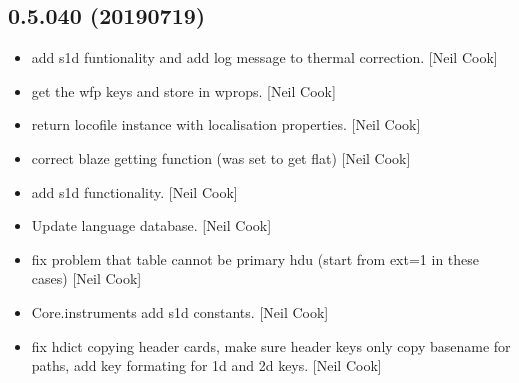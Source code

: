 \documentclass[a4paper,10pt,english]{report}
\begin{document}
\subsection{0.5.040 (2019\sphinxhyphen{}07\sphinxhyphen{}19)}
\label{\detokenize{misc/changelog:id121}}\begin{itemize}
\item {} 
 \sphinxhyphen{} add s1d funtionality and add log message
to thermal correction. {[}Neil Cook{]}

\item {} 
 \sphinxhyphen{} get the wfp keys and store in wprops. {[}Neil
Cook{]}

\item {} 
 \sphinxhyphen{} return locofile instance with
localisation properties. {[}Neil Cook{]}

\item {} 
 \sphinxhyphen{} correct blaze getting function (was set
to get flat) {[}Neil Cook{]}

\item {} 
 \sphinxhyphen{} add s1d functionality. {[}Neil Cook{]}

\item {} 
Update language database. {[}Neil Cook{]}

\item {} 
 \sphinxhyphen{} fix problem that table cannot be primary hdu (start from
ext=1 in these cases) {[}Neil Cook{]}

\item {} 
Core.instruments \sphinxhyphen{} add s1d constants. {[}Neil Cook{]}

\item {} 
 \sphinxhyphen{} fix hdict copying header cards, make sure header keys
only copy basename for paths, add key formating for 1d and 2d keys.
{[}Neil Cook{]}

\end{itemize}
\end{document}
